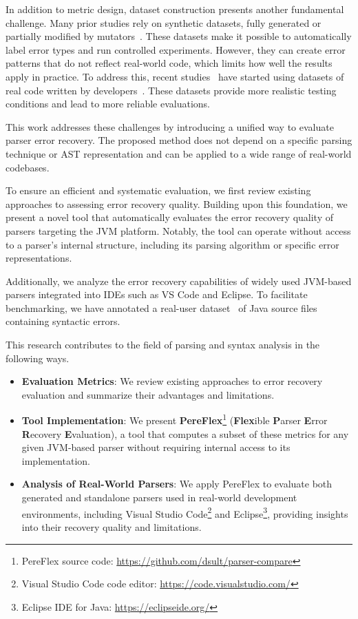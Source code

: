 \documentclass[conference]{IEEEtran}
\begin{document}
In addition to metric design, dataset construction presents another fundamental challenge. Many prior studies rely on synthetic datasets, fully generated or partially modified by mutators~\cite{natural_recovery, fuzz_recovery, ai_recovery}. These datasets make it possible to automatically label error types and run controlled experiments. However, they can create error patterns that do not reflect real-world code, which limits how well the results apply in practice. To address this, recent studies~\cite{panic, ai_recovery, ide-errors} have started using datasets of real code written by developers~\cite{blackbox}. These datasets provide more realistic testing conditions and lead to more reliable evaluations.

This work addresses these challenges by introducing a unified way to evaluate parser error recovery. The proposed method does not depend on a specific parsing technique or AST representation and can be applied to a wide range of real-world codebases. 

To ensure an efficient and systematic evaluation, we first review existing approaches to assessing error recovery quality.  Building upon this foundation, we present a novel tool that automatically evaluates the error recovery quality of parsers targeting the JVM platform. Notably, the tool can operate without access to a parser’s internal structure, including its parsing algorithm or specific error representations.
 
Additionally, we analyze the error recovery capabilities of widely used JVM-based parsers integrated into  IDEs such as VS Code and Eclipse. To facilitate benchmarking, we have  annotated a real-user dataset~\cite{blackbox} of Java source files containing syntactic errors. 


This research contributes to the field of parsing and syntax analysis in the following ways.
\begin{itemize}
    \item \textbf{Evaluation Metrics}: We review existing approaches to error recovery evaluation and summarize their advantages and limitations.
    \item \textbf{Tool Implementation}: We present \textbf{PereFlex}\footnote{PereFlex source code: \url{https://github.com/dsult/parser-compare}} (\textbf{Flex}ible \textbf{P}arser \textbf{E}rror \textbf{R}ecovery \textbf{E}valuation), a tool that computes a subset of these metrics for any given JVM-based parser without requiring internal access to its implementation.
    \item \textbf{Analysis of Real-World Parsers}: We apply PereFlex to evaluate both generated and standalone parsers used in real-world development environments, including Visual Studio Code\footnote{Visual Studio Code code editor: \url{https://code.visualstudio.com/}} and Eclipse\footnote{Eclipse IDE for Java: \url{https://eclipseide.org/}}, providing insights into their recovery quality and limitations. 
\end{itemize}
\end{document}
